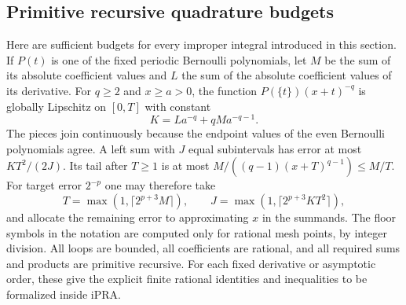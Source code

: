 \subsection{Primitive recursive quadrature budgets}

Here are sufficient budgets for every improper integral introduced in
this section.  If $P(t)$ is one of the fixed periodic Bernoulli
polynomials, let $M$ be the sum of its absolute coefficient values and
$L$ the sum of the absolute coefficient values of its derivative.  For
$q\ge2$ and $x\ge a>0$, the function
$P(\{t\})(x+t)^{-q}$ is globally Lipschitz on $[0,T]$ with constant
\[
 K=L a^{-q}+qM a^{-q-1}.
\]
The pieces join continuously because the endpoint values of the even
Bernoulli polynomials agree.  A left sum with $J$ equal subintervals has
error at most $KT^2/(2J)$.  Its tail after $T\ge1$ is at most
$M/((q-1)(x+T)^{q-1})\le M/T$.
For target error $2^{-p}$ one may therefore take
\[
 T=\max(1,\lceil 2^{p+3}M\rceil),\qquad
 J=\max(1,\lceil 2^{p+3}KT^2\rceil),
\]
and allocate the remaining error to approximating $x$ in the summands.
The floor symbols in the notation are computed only for rational mesh
points, by integer division.  All loops are bounded, all coefficients
are rational, and all required sums and products are primitive recursive.
For each fixed derivative or asymptotic order, these give the explicit
finite rational identities and inequalities to be formalized inside iPRA.

